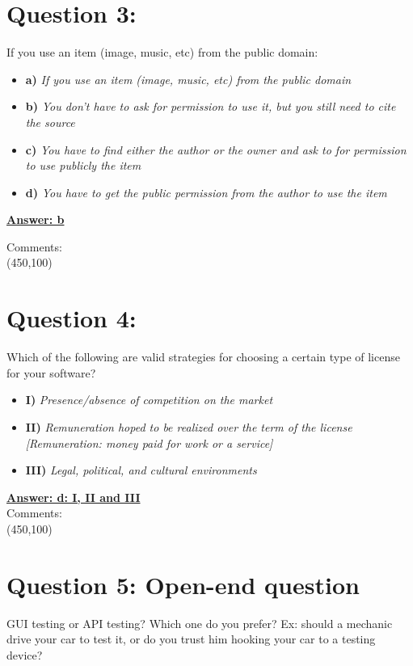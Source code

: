 \documentclass[12pt,a4paper,norsk]{article}
\begin{document}
\section {Question 3:} If you use an item (image, music, etc) from the public domain:  \\

\begin{itemize}
 \item \textbf{a)} \textit{If you use an item (image, music, etc) from the public domain}
 \item \textbf{b)} \textit{You don’t have to ask for permission to use it, but you still need to cite the source}
 \item \textbf{c)} \textit{You have to find either the author or the owner and ask to for permission to use publicly the item}
 \item \textbf{d)} \textit{You have to get the public permission from the author to use the item}
\end{itemize}

\underline{\textbf{Answer: b}} 

\noindent Comments:\\
\framebox(450,100){}\\

\section {Question 4:} Which of the following are valid strategies for choosing a certain type of license for your software?\\

\begin{itemize}
 \item \textbf{I)} \textit{Presence/absence of competition on the market}
 \item \textbf{II)} \textit{Remuneration hoped to be realized over the term of the license [Remuneration: money paid for work or a service]}
 \item \textbf{III)} \textit{Legal, political, and cultural environments}
\end{itemize}

\underline{\textbf{Answer: d: I, II and III}} \\

\noindent Comments:\\
\framebox(450,100){}\\

\section {Question 5: Open-end question} GUI testing or API testing? Which one do you prefer?
Ex: should a mechanic drive your car to test it, or do you trust him hooking your car to a testing device? \\
\end{document}
